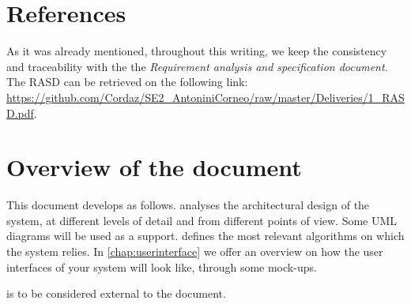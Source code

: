\section{References}\hypertarget{subsec:references}{}
As it was already mentioned, throughout this writing, we keep the consistency and traceability with the the \emph{Requirement analysis and specification document}. The RASD can be retrieved on the following link: \url{https://github.com/Cordaz/SE2_AntoniniCorneo/raw/master/Deliveries/1_RASD.pdf}.


\section{Overview of the document}	
This document develops as follows.  analyses the architectural design of the system, at different levels of detail and from different points of view. Some UML diagrams will be used as a support.  defines the most relevant algorithms on which the system relies. In \cref{chap:userinterface} we offer an overview on how the user interfaces of your system will look like, through some mock-ups. 

 is to be considered external to the document.

